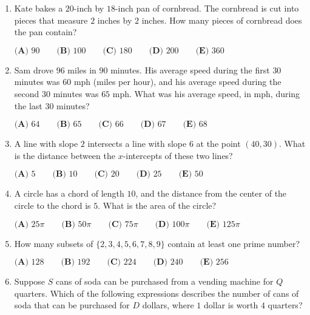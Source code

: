 \documentclass{article}
\begin{document}
\begin{enumerate}[label=\arabic*., itemsep=0.5em]
\item Kate bakes a \(20\)-inch by \(18\)-inch pan of cornbread. The cornbread is cut into pieces that measure \(2\) inches by \(2\) inches. How many pieces of cornbread does the pan contain?

\(\textbf{(A) } 90 \qquad \textbf{(B) } 100 \qquad \textbf{(C) } 180 \qquad \textbf{(D) } 200 \qquad \textbf{(E) } 360\)\par \vspace{0.5em}\item Sam drove \(96\) miles in \(90\) minutes. His average speed during the first \(30\) minutes was \(60\) mph (miles per hour), and his average speed during the second \(30\) minutes was \(65\) mph. What was his average speed, in mph, during the last \(30\) minutes?

\(
\textbf{(A) } 64 \qquad
\textbf{(B) } 65 \qquad
\textbf{(C) } 66 \qquad
\textbf{(D) } 67 \qquad
\textbf{(E) } 68
\)\par \vspace{0.5em}\item A line with slope \(2\) intersects a line with slope \(6\) at the point \((40,30)\). What is the distance between the \(x\)-intercepts of these two lines? 

\(\textbf{(A) } 5 \qquad \textbf{(B) } 10 \qquad \textbf{(C) } 20 \qquad \textbf{(D) } 25 \qquad \textbf{(E) } 50\)\par \vspace{0.5em}\item A circle has a chord of length \(10\), and the distance from the center of the circle to the chord is \(5\). What is the area of the circle?

\(
\textbf{(A) }25\pi \qquad
\textbf{(B) }50\pi \qquad
\textbf{(C) }75\pi \qquad
\textbf{(D) }100\pi \qquad
\textbf{(E) }125\pi \qquad
\)\par \vspace{0.5em}\item How many subsets of \(\{2,3,4,5,6,7,8,9\}\) contain at least one prime number?

\(
\textbf{(A) } 128 \qquad
\textbf{(B) } 192 \qquad
\textbf{(C) } 224 \qquad
\textbf{(D) } 240 \qquad
\textbf{(E) } 256
\)\par \vspace{0.5em}\item Suppose \(S\) cans of soda can be purchased from a vending machine for \(Q\) quarters. Which of the following expressions describes the number of cans of soda that can be purchased for \(D\) dollars, where \(1\) dollar is worth \(4\) quarters?


\end{enumerate}
\end{document}
